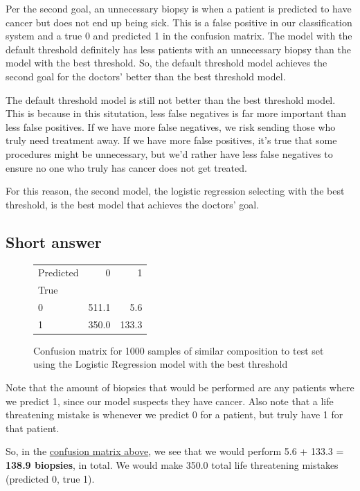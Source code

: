 \documentclass[12pt]{article}
\begin{document}
    Per the second goal, an unnecessary biopsy is when a patient is predicted
    to have cancer but does not end up being sick. This is a false positive in
    our classification system and a true 0 and predicted 1 in the confusion
    matrix. The model with the default threshold definitely has less
    patients with an unnecessary biopsy than the model with the best threshold.
    So, the default threshold model achieves the second goal for the doctors'
    better than the best threshold model.

    The default threshold model is still not better than the best threshold
    model. This is because in this situtation, less false negatives is far more
    important than less false positives. If we have more false negatives, we
    risk sending those who truly need treatment away. If we have more false
    positives, it's true that some procedures might be unnecessary, but we'd
    rather have less false negatives to ensure no one who truly has cancer does
    not get treated.

    For this reason, the second model, the logistic regression
    selecting with the best threshold, is the best model that achieves the
    doctors' goal.

\pagebreak
\subsection{Short answer}

\begin{figure}[htbp]
    \centering

    \begin{tabular}{lrr}
        \toprule
        Predicted & 0 & 1 \\
        True &  &  \\
        \midrule
        0 & 511.1 & 5.6 \\
        1 & 350.0 & 133.3 \\
        \bottomrule
        \end{tabular}
    
    \caption{Confusion matrix for 1000 samples of similar composition to test set using the Logistic Regression model with the best threshold}
    \label{fig:2}
\end{figure}

Note that the amount of biopsies that would be performed are any patients where
we predict 1, since our model suspects they have cancer. Also note that a life
threatening mistake is whenever we predict 0 for a patient, but truly have 1
for that patient.

So, in the \hyperref[fig:2]{confusion matrix above}, we see that we would
perform 5.6 + 133.3 = \textbf{138.9 biopsies}, in total. We would make 350.0
total life threatening mistakes (predicted 0, true 1).
\end{document}
